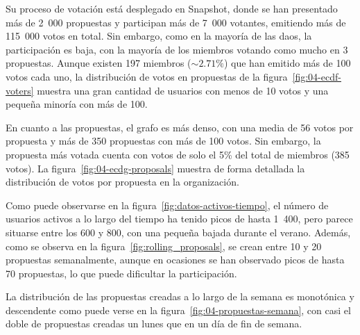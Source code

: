 Su proceso de votación está desplegado en Snapshot, donde se han presentado más de 2~000 propuestas y participan más de 7~000 votantes, emitiendo más de 115~000 votos en total. Sin embargo, como en la mayoría de las \glspl{dao}, la participación es baja, con la mayoría de los miembros votando como mucho en 3 propuestas. Aunque existen 197 miembros (${\sim}2.71\%$) que han emitido más de 100 votos cada uno, la distribución de votos en propuestas de la figura~\ref{fig:04-ecdf-voters} muestra una gran cantidad de usuarios con menos de 10 votos y una pequeña minoría con más de 100.

En cuanto a las propuestas, el grafo es más denso, con una media de 56 votos por propuesta y más de 350 propuestas con más de 100 votos. Sin embargo, la propuesta más votada cuenta con votos de solo el 5\% del total de miembros (385 votos). La figura~\ref{fig:04-ecdg-proposals} muestra de forma detallada la distribución de votos por propuesta en la organización.

Como puede observarse en la figura~\ref{fig:datos-activos-tiempo}, el número de usuarios activos a lo largo del tiempo ha tenido picos de hasta 1~400, pero parece situarse entre los 600 y 800, con una pequeña bajada durante el verano. Además, como se observa en la figura~\ref{fig:rolling_proposals}, se crean entre 10 y 20 propuestas semanalmente, aunque en ocasiones se han observado picos de hasta 70 propuestas, lo que puede dificultar la participación.

La distribución de las propuestas creadas a lo largo de la semana es monotónica y descendente como puede verse en la figura~\ref{fig:04-propuestas-semana}, con casi el doble de propuestas creadas un lunes que en un día de fin de semana.

